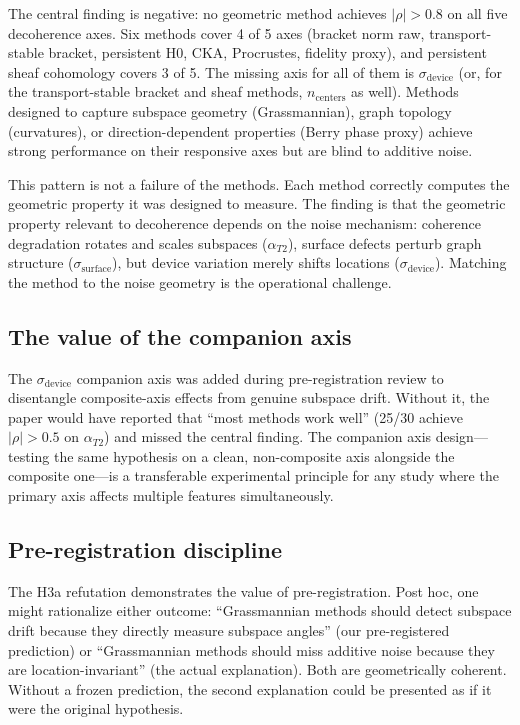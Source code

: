 \documentclass[11pt]{article}
\begin{document}
The central finding is negative: no geometric method achieves
$|\rho| > 0.8$ on all five decoherence axes.  Six methods cover 4 of
5 axes (bracket norm raw, transport-stable bracket, persistent H0,
CKA, Procrustes, fidelity proxy), and persistent sheaf cohomology
covers 3 of 5.  The missing axis for all of them is
$\sigma_\text{device}$ (or, for the transport-stable bracket and sheaf
methods, $n_\text{centers}$ as well).  Methods designed to capture subspace geometry
(Grassmannian), graph topology (curvatures), or direction-dependent
properties (Berry phase proxy) achieve strong performance on their
responsive axes but are blind to additive noise.

This pattern is not a failure of the methods.  Each method correctly
computes the geometric property it was designed to measure.  The
finding is that the geometric property relevant to decoherence depends
on the noise mechanism: coherence degradation rotates and scales
subspaces ($\alpha_{T2}$), surface defects perturb graph structure
($\sigma_\text{surface}$), but device variation merely shifts
locations ($\sigma_\text{device}$).  Matching the method to the noise
geometry is the operational challenge.

\subsection{The value of the companion axis}

The $\sigma_\text{device}$ companion axis was added during
pre-registration review to disentangle composite-axis effects from
genuine subspace drift.  Without it, the paper would have reported that
``most methods work well'' (25/30 achieve $|\rho| > 0.5$ on
$\alpha_{T2}$) and missed the central finding.  The companion axis design---testing the same
hypothesis on a clean, non-composite axis alongside the composite
one---is a transferable experimental principle for any study where the
primary axis affects multiple features simultaneously.

\subsection{Pre-registration discipline}

The H3a refutation demonstrates the value of pre-registration.  Post
hoc, one might rationalize either outcome: ``Grassmannian methods should
detect subspace drift because they directly measure subspace angles''
(our pre-registered prediction) or ``Grassmannian methods should miss
additive noise because they are location-invariant'' (the actual
explanation).  Both are geometrically coherent.  Without a frozen
prediction, the second explanation could be presented as if it were
the original hypothesis.
\end{document}

